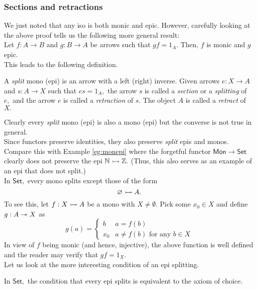 \subsubsection{Sections and retractions}
We just noted that any iso is both monic and epic. However, carefully looking at the above proof tells us the following more general result:\\
Let $f:A\to B$ and $g:B\to A$ be arrows such that $gf = 1_A.$ Then, $f$ is monic and $g$ epic.\\
This leads to the following definition.
\begin{defn} 
	A \emph{split} mono (epi) is an arrow with a left (right) inverse. Given arrows $e:X \to A$ and $s:A \to X$ such that $es = 1_A,$ the arrow $s$ is called a \emph{section} or a \emph{splitting} of $e,$ and the arrow $e$ is called a \emph{retraction} of $s.$ The object $A$ is called a \emph{retract} of $X.$
\end{defn}
Clearly every \emph{split} mono (epi) is also a mono (epi) but the converse is not true in general.\\
Since functors preserve identities, they also preserve \emph{split} epis and monos. Compare this with Example \ref{eg:monepi} where the forgetful functor $\mathsf{Mon}\to \mathsf{Set}$ clearly does not preserve the epi $\mathbb{N}\rightarrowtail \mathbb{Z}.$ (Thus, this also serves as an example of an epi that does not split.)\\
\example{} In $\mathsf{Set},$ every mono splits except those of the form
\begin{equation*} 
	\varnothing \rightarrowtail A.
\end{equation*}
To see this, let $f:X \rightarrowtail A$ be a mono with $X \neq \emptyset.$ Pick some $x_0 \in X$ and define $g:A \twoheadrightarrow X$ as
\begin{equation*} 
	g(a) = \begin{cases}
		b & a = f(b)\\
		x_0	& a \neq f(b) \text{ for any } b \in X
	\end{cases}
\end{equation*}	
In view of $f$ being monic (and hence, injective), the above function is well defined and the reader may verify that $gf = 1_X.$\\
Let us look at the more interesting condition of an epi splitting.
\begin{lem} \label{lem:episplit}
	In $\mathsf{Set},$ the condition that every epi splits is equivalent to the axiom of choice.
\end{lem}
